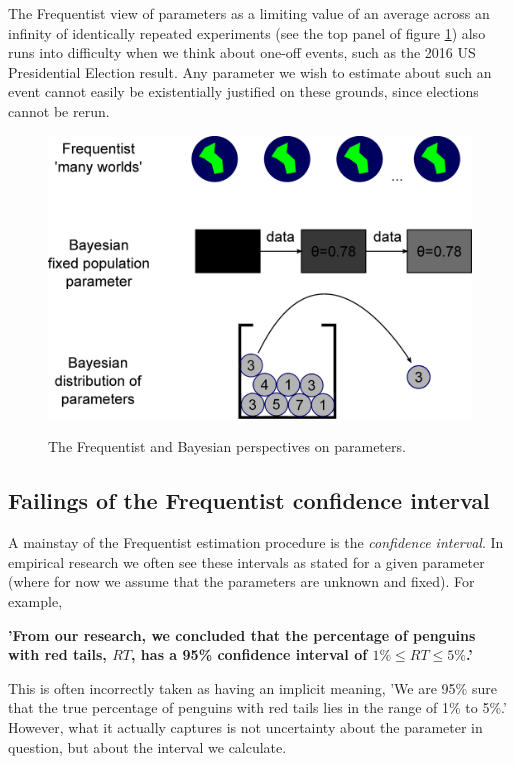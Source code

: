\documentclass[11pt,fullpage]{book}
\begin{document}
The Frequentist view of parameters as a limiting value of an average across an infinity of identically repeated experiments (see the top panel of figure \ref{fig:Posterior_manyWorldsDoParametersExist}) also runs into difficulty when we think about one-off events, such as the 2016 US Presidential Election result. Any parameter we wish to estimate about such an event cannot easily be existentially justified on these grounds, since elections cannot be rerun.


\begin{figure}
\centering
\scalebox{0.2} 
{\includegraphics{Posterior_manyWorldsDoParametersExist.eps}}
\caption{The Frequentist and Bayesian perspectives on parameters.}\label{fig:Posterior_manyWorldsDoParametersExist}
\end{figure}

\subsection{Failings of the Frequentist confidence interval}\label{sec:Posterior_classicalConfidenceInterval}
A mainstay of the Frequentist estimation procedure is the \textit{confidence interval}. In empirical research we often see these intervals as stated for a given parameter (where for now we assume that the parameters are unknown and fixed). For example,

\textbf{'From our research, we concluded that the percentage of penguins with red tails, $RT$, has a 95\% confidence interval of $1\%\leq RT \leq 5\%$.'}

This is often incorrectly taken as having an implicit meaning, 'We are 95\% sure that the true percentage of penguins with red tails lies in the range of 1\% to 5\%.' However, what it actually captures is not uncertainty about the parameter in question, but about the interval we calculate. 
\end{document}

